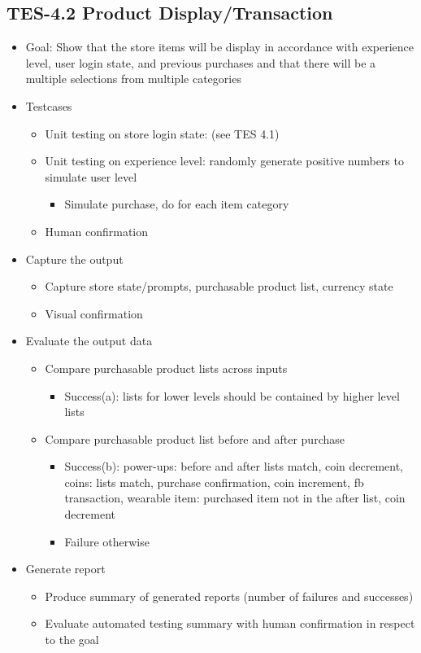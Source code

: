 \subsection{TES-4.2 Product Display/Transaction}
\begin{itemize}
\item Goal: Show that the store items will be display in accordance with experience level, user login state, and previous purchases and that there will be a multiple selections from multiple categories

\item Testcases
\begin{itemize}
\item Unit testing on store login state: (see TES 4.1)
\item Unit testing on experience level: randomly generate positive numbers to simulate user level
\begin{itemize}
\item Simulate purchase, do for each item category
\end{itemize}
\item Human confirmation
\end{itemize}

\item Capture the output
\begin{itemize}
\item Capture store state/prompts, purchasable product list, currency state
\item Visual confirmation
\end{itemize}

\item Evaluate the output data
\begin{itemize}
\item Compare purchasable product lists across inputs
\begin{itemize}
\item Success(a): lists for lower levels should be contained by higher level lists
\end{itemize}
\item Compare purchasable product list before and after purchase
\begin{itemize}
\item Success(b): power-ups: before and after lists match, coin decrement, coins: lists match, purchase confirmation, coin increment, fb transaction, wearable item:	 purchased item not in the after list, coin decrement
\item Failure otherwise
\end{itemize}
\end{itemize}

\item Generate report
\begin{itemize}
\item Produce summary of generated reports (number of failures and successes)
\item Evaluate automated testing summary with human confirmation in respect to the goal
\end{itemize}
\end{itemize}


